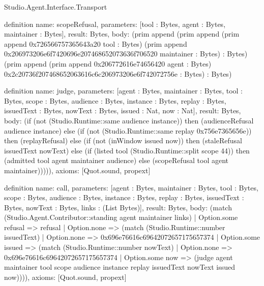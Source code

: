 \begin{lexlean}{Studio.Agent.Interface.Transport}
\begin{semanticmodule}
definition{
  name: scopeRefusal,
  parameters: [tool : Bytes, agent : Bytes, maintainer : Bytes],
  result: Bytes,
  body: (prim append (prim append (prim append 0x726566757365643a20 tool : Bytes) (prim append 0x206973206e6f7420696e207468652073636f706520 maintainer : Bytes) : Bytes) (prim append (prim append 0x206772616e74656420 agent : Bytes) 0x2c20736f207468652063616c6c206973206e6f742072756e : Bytes) : Bytes)
}

definition{
  name: judge,
  parameters: [agent : Bytes, maintainer : Bytes, tool : Bytes, scope : Bytes, audience : Bytes, instance : Bytes, replay : Bytes, issuedText : Bytes, nowText : Bytes, issued : Nat, now : Nat],
  result: Bytes,
  body: (if (not (Studio.Runtime::same audience instance)) then (audienceRefusal audience instance) else (if (not (Studio.Runtime::same replay 0x756e7365656e)) then (replayRefusal) else (if (not (inWindow issued now)) then (staleRefusal issuedText nowText) else (if (listed tool (Studio.Runtime::split scope 44)) then (admitted tool agent maintainer audience) else (scopeRefusal tool agent maintainer))))),
  axioms: [Quot.sound, propext]
}

definition{
  name: call,
  parameters: [agent : Bytes, maintainer : Bytes, tool : Bytes, scope : Bytes, audience : Bytes, instance : Bytes, replay : Bytes, issuedText : Bytes, nowText : Bytes, links : (List Bytes)],
  result: Bytes,
  body: (match (Studio.Agent.Contributor::standing agent maintainer links)
    | Option.some refusal => refusal
    | Option.none => (match (Studio.Runtime::number issuedText)
      | Option.none => 0x696e76616c69642072657175657374
      | Option.some issued => (match (Studio.Runtime::number nowText)
        | Option.none => 0x696e76616c69642072657175657374
        | Option.some now => (judge agent maintainer tool scope audience instance replay issuedText nowText issued now)))),
  axioms: [Quot.sound, propext]
}


\end{semanticmodule}
\end{lexlean}
